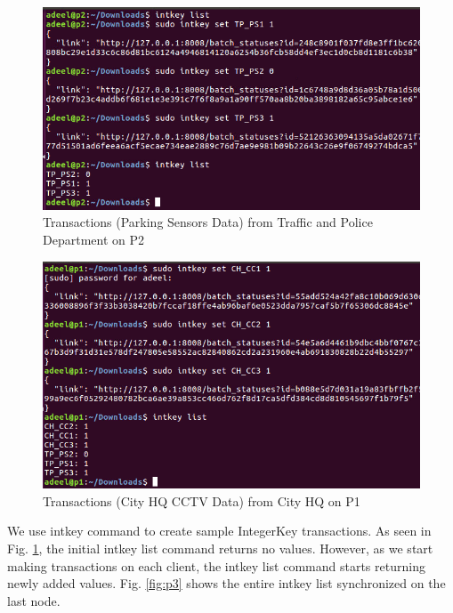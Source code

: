 \begin{figure}[H] %
    \centering
    \includegraphics[scale=.60]{figs/1TP_Trans.PNG}
    \setlength{\belowcaptionskip}{-15pt}
    \caption{Transactions (Parking Sensors Data) from Traffic and Police Department on P2}
    \label{fig:p1} %
\end{figure}

\begin{figure}[H] %
    \centering
    \includegraphics[scale=.60]{figs/2CQ_Trans.PNG}
    \setlength{\belowcaptionskip}{-15pt}
    \caption{Transactions (City HQ CCTV Data) from City HQ on P1}
    \label{fig:p2} %
\end{figure}

We use intkey command to create sample IntegerKey transactions. As seen in Fig. \ref{fig:p1}, the initial intkey list command returns no values. However, as we start making transactions on each client, the intkey list command starts returning newly added values. Fig. \ref{fig:p3} shows the entire intkey list synchronized on the last node.

